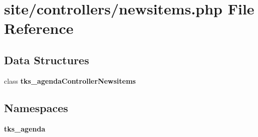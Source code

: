 \section{site/controllers/newsitems.php File Reference}
\label{site_2controllers_2newsitems_8php}
\subsection*{Data Structures}
\begin{DoxyCompactItemize}
\item 
class \textbf{ tks\+\_\+agenda\+Controller\+Newsitems}
\end{DoxyCompactItemize}
\subsection*{Namespaces}
\begin{DoxyCompactItemize}
\item 
 \textbf{ tks\+\_\+agenda}
\end{DoxyCompactItemize}
